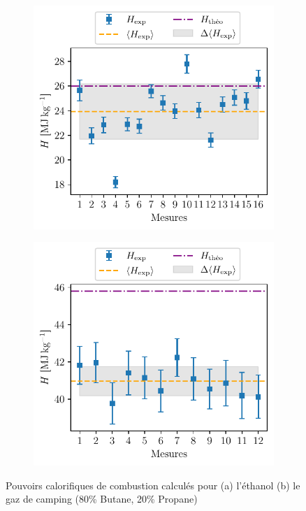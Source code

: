\begin{figure}[h]
    \centering
    \begin{subfigure}{0.5\linewidth}
        \centering
        \includegraphics[width=\linewidth]{figures/ethanol.pdf}
        \caption{}
        \label{fig:H_etanol}
    \end{subfigure}%
    \begin{subfigure}{0.5\linewidth}
        \centering
        \includegraphics[width=\linewidth]{figures/gaz_camping.pdf}
        \caption{}
        \label{fig:H_gaz_camping}
    \end{subfigure}
    \caption{Pouvoirs calorifiques de combustion calculés pour (a) l'éthanol (b) le gaz de camping (80\% Butane, 20\% Propane)}
\end{figure}

